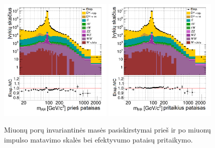 \documentclass[a4paper, 12pt, oneside]{article}
\begin{document}
\begin{figure}[b!]
	\includegraphics[width=0.48\textwidth]{Kursinis3/mumu_mass_before.png}
	\includegraphics[width=0.48\textwidth]{Kursinis3/mumu_mass_afterSF.png}
	\vspace{-0.5cm}
	\caption{\label{fig:invMba} Miuonų porų invariantinės masės pasiskirstymai prieš ir po miuonų impulso matavimo skalės
	bei efektyvumo pataisų pritaikymo.}
\end{figure}
\end{document}
